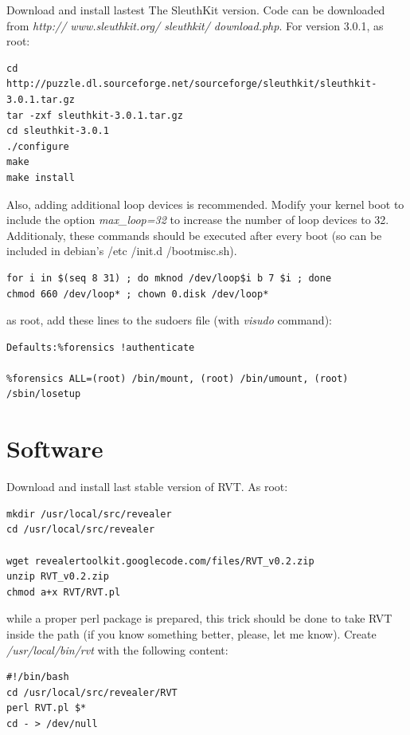 \documentclass[a4paper,11pt,oneside]{report}
\begin{document}
Download and install lastest The SleuthKit version. Code can be downloaded from \emph{http:// www.sleuthkit.org/ sleuthkit/ download.php}. For version 3.0.1, as root:

\begin{verbatim}
cd
http://puzzle.dl.sourceforge.net/sourceforge/sleuthkit/sleuthkit-3.0.1.tar.gz
tar -zxf sleuthkit-3.0.1.tar.gz
cd sleuthkit-3.0.1
./configure
make
make install
\end{verbatim}



Also, adding additional loop devices is recommended. Modify your kernel boot to include the option \emph{max\_loop=32} to increase the number of loop devices to 32. Additionaly, these commands should be executed after every boot (so can be included in debian's /etc /init.d /bootmisc.sh).

\begin{verbatim}
for i in $(seq 8 31) ; do mknod /dev/loop$i b 7 $i ; done
chmod 660 /dev/loop* ; chown 0.disk /dev/loop* 
\end{verbatim}  

as root, add these lines to the sudoers file (with \emph{visudo} command):

\begin{verbatim}
Defaults:%forensics !authenticate

%forensics ALL=(root) /bin/mount, (root) /bin/umount, (root) /sbin/losetup
\end{verbatim}


\section{Software}

Download and install last stable version of RVT. As root:

\begin{verbatim}
mkdir /usr/local/src/revealer
cd /usr/local/src/revealer

wget revealertoolkit.googlecode.com/files/RVT_v0.2.zip
unzip RVT_v0.2.zip
chmod a+x RVT/RVT.pl

\end{verbatim}

while a proper perl package is prepared, this trick should be done to take RVT inside the path (if you know something better, please, let me know). Create \emph{/usr/local/bin/rvt} with the following content:

\begin{verbatim}
#!/bin/bash
cd /usr/local/src/revealer/RVT
perl RVT.pl $*
cd - > /dev/null
\end{verbatim}
\end{document}
